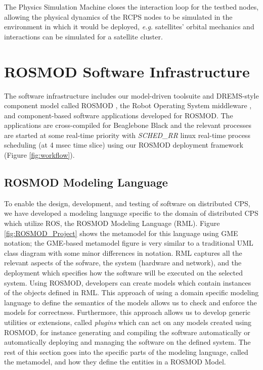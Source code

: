 The Physics Simulation Machine closes the interaction loop for the testbed nodes, allowing the physical dynamics of the RCPS nodes to be simulated in the environment in which it would be deployed, \emph{e.g.} satellites' orbital mechanics and interactions can be simulated for a satellite cluster. 

\section{ROSMOD Software Infrastructure}

The software infrastructure includes our model-driven toolsuite and DREMS-style component model called ROSMOD \cite{kumarROSMOD}, the Robot Operating System middleware \cite{ROS}, and component-based software applications developed for ROSMOD. The applications are cross-compiled for Beaglebone Black and the relevant processes are started at some real-time priority with \emph{SCHED\_RR} linux real-time process scheduling (at 4 msec time slice) using our ROSMOD deployment framework (Figure \ref{fig:workflow}).

\subsection{ROSMOD Modeling Language}

To enable the design, development, and testing of software on distributed CPS, we have developed a modeling language specific to the domain of distributed CPS which utilize ROS, the ROSMOD Modeling Language (RML). Figure \ref{fig:ROSMOD_Project} shows the metamodel for this language using GME \cite{Ledeczi01thegeneric} notation; the GME-based metamodel figure is very similar to a traditional UML class diagram with some minor differences in notation. RML captures all the relevant aspects of the sofware, the system (hardware and network), and the deployment which specifies how the software will be executed on the selected system.  Using ROSMOD, developers can create models which contain instances of the objects defined in RML. This approach of using a domain specific modeling language to define the semantics of the models allows us to check and enforce the models for correctness.  Furthermore, this approach allows us to develop generic utilities or extensions, called \emph{plugins} \cite{maroti2014next} which can act on any models created using ROSMOD, for instance generating and compiling the software automatically or automatically deploying and managing the software on the defined system. The rest of this section goes into the specific parts of the modeling language, called the metamodel, and how they define the entities in a ROSMOD Model.

